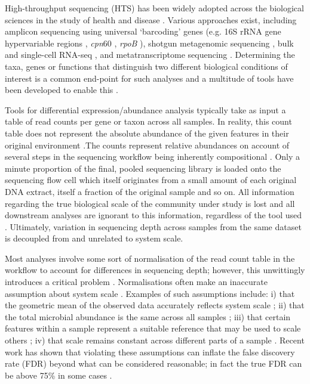 \documentclass[10pt,letterpaper]{article}
\begin{document}
High-throughput sequencing (HTS) has been widely adopted across the biological sciences in the study of health and disease \cite{malla_exploring_2019, Montgomery:2022aa}. Various approaches exist, including amplicon sequencing using universal `barcoding' genes (e.g. 16S rRNA gene hypervariable regions \cite{johnson_evaluation_2019}, \textit{cpn}60 \cite{vancuren_variant_2020}, \textit{rpoB} \cite{ogier_rpob_2019}), shotgun metagenomic sequencing \cite{quince_shotgun_2017}, bulk and single-cell RNA-seq \cite{gate_clonally_2020,jovic_single_2022}, and metatranscriptome sequencing \cite{france_insight_2022}. Determining the taxa, genes or functions that distinguish two different biological conditions of interest is a common end-point for such analyses and a multitude of tools have been developed to enable this \cite{Quinn:2019aa, liu_practical_2021}.

Tools for differential expression/abundance analysis typically take as input a table of read counts per gene or taxon across all samples. In reality, this count table does not represent the absolute abundance of the given features in their original environment \cite{gloor_its_2016,vandeputte_quantitative_2017}.The counts represent relative abundances on account of several steps in the sequencing workflow being inherently compositional \cite{gloor_compositional_2016}. Only a minute proportion of the final, pooled sequencing library is loaded onto the sequencing flow cell which itself originates from a small amount of each original DNA extract, itself a fraction of the original sample and so on. All information regarding the true biological scale of the community under study is lost and all downstream analyses are ignorant to this information, regardless of the tool used \cite{lovell_proportions_2011}. Ultimately, variation in sequencing depth across samples from the same dataset is decoupled from and unrelated to system scale.

Most analyses involve some sort of normalisation of the read count table in the workflow to account for differences in sequencing depth; however, this unwittingly introduces a critical problem \cite{weiss_normalization_2017}. Normalisations often make an inaccurate assumption about system scale \cite{nixon_scale_2024, nixon_incorporating_2025, gloor_explicit_2025}. Examples of such assumptions include: i) that the geometric mean of the observed data accurately reflects system scale \cite{aitchison_statistical_1986}; ii) that the total microbial abundance is the same across all samples \cite{hughes_rarefaction_2005}; iii) that certain features within a sample represent a suitable reference that may be used to scale others \cite{robinson_scaling_2010,vandesompele_accurate_2002}; iv) that scale remains constant across different parts of a sample \cite{anders_2010_differential}. Recent work has shown that violating these assumptions can inflate the false discovery rate (FDR) beyond what can be considered reasonable; in fact the true FDR can be above 75\% in some cases \cite{li_exaggerated_2022,konnaris_uncertainty_2025,nixon_incorporating_2025,gloor_explicit_2025}.
\end{document}
